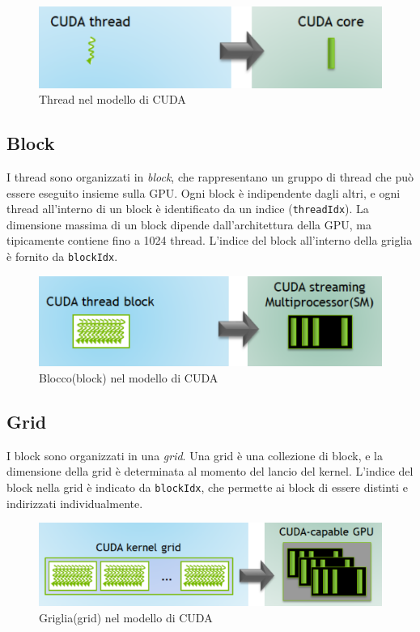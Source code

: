 \documentclass[12pt,a4paper]{report}
\begin{document}
\begin{figure}[h]
    \centering
    \includegraphics[width=0.7\linewidth]{img/cuda_thread.png}
    \caption{Thread nel modello di CUDA \cite{CUDA_blog}}
\end{figure}

\subsection*{Block}
I thread sono organizzati in \textit{block}, che rappresentano un gruppo di thread che può essere eseguito insieme sulla GPU. Ogni block è indipendente dagli altri, e ogni thread all'interno di un block è identificato da un indice (\texttt{threadIdx}). La dimensione massima di un block dipende dall'architettura della GPU, ma tipicamente contiene fino a 1024 thread. L'indice del block all'interno della griglia è fornito da \texttt{blockIdx}.

\begin{figure}[h]
    \centering
    \includegraphics[width=0.7\linewidth]{img/cuda_block.png}
    \caption{Blocco(block) nel modello di CUDA \cite{CUDA_blog}}
\end{figure}



\subsection*{Grid}
I block sono organizzati in una \textit{grid}. Una grid è una collezione di block, e la dimensione della grid è determinata al momento del lancio del kernel. L'indice del block nella grid è indicato da \texttt{blockIdx}, che permette ai block di essere distinti e indirizzati individualmente.

\begin{figure}[h]
    \centering
    \includegraphics[width=0.7\linewidth]{img/cuda_grid.png}
    \caption{Griglia(grid) nel modello di CUDA \cite{CUDA_blog}}
\end{figure}
\end{document}
